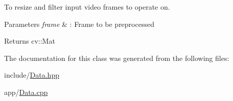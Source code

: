 To resize and filter input video frames to operate on. 


\begin{DoxyParams}{Parameters}
{\em frame} & \+: Frame to be preprocessed \\
\hline
\end{DoxyParams}
\begin{DoxyReturn}{Returns}
cv\+::\+Mat 
\end{DoxyReturn}


The documentation for this class was generated from the following files\+:\begin{DoxyCompactItemize}
\item 
include/\hyperlink{Data_8hpp}{Data.\+hpp}\item 
app/\hyperlink{Data_8cpp}{Data.\+cpp}\end{DoxyCompactItemize}
